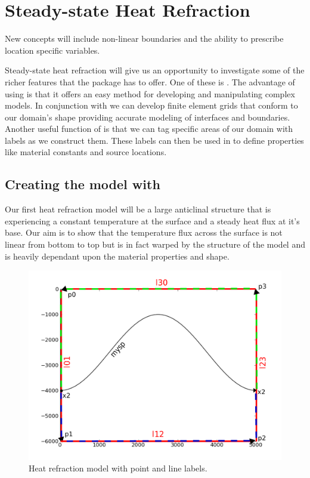 
%
%
%

\section{Steady-state Heat Refraction}
\label{STEADY-STATE HEAT REFRACTION}


New concepts will include non-linear boundaries and the ability to prescribe location specific variables.

Steady-state heat refraction will give us an opportunity to investigate some of the richer features that the \esc package has to offer. One of these is \pycad . The advantage of using \pycad is that it offers an easy method for developing and manipulating complex models. In conjunction with \gmsh we can develop finite element grids that conform to our domain's shape providing accurate modeling of interfaces and boundaries. Another useful function of \pycad is that we can tag specific areas of our domain with labels as we construct them. These labels can then be used in \esc to define properties like material constants and source locations. 

\subsection{Creating the model with \pycad}

Our first heat refraction model will be a large anticlinal structure that is experiencing a constant temperature at the surface and a steady heat flux at it's base. Our aim is to show that the temperature flux across the surface is not linear from bottom to top but is in fact warped by the structure of the model and is heavily dependant upon the material properties and shape.

\begin{figure}[h!]
\centerline{\includegraphics[width=4.in]{figures/anticlineheatrefraction}}
\caption{Heat refraction model with point and line labels.}
\label{fig:anticlinehrmodel}
\end{figure}

